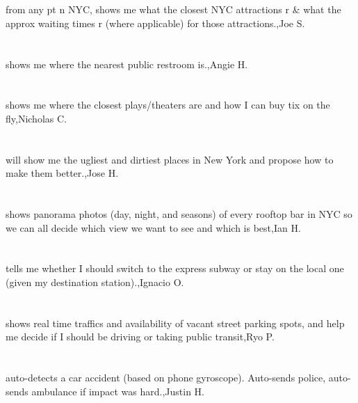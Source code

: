 \section{}from any pt n NYC, shows me what the closest NYC attractions r \& what the approx waiting times r (where applicable) for those attractions.,Joe S.
\section{}shows me where the nearest public restroom is.,Angie H.
\section{}shows me where the closest plays/theaters are and how I can buy tix on the fly,Nicholas C.
\section{}will show me  the ugliest and dirtiest  places in New York and propose how to make them better.,Jose H.
\section{}shows panorama photos (day, night, and seasons) of every rooftop bar in NYC so we can all decide which view we want to see and which is best,Ian H.
\section{}tells me whether I should switch to the express subway or stay on the local one (given my destination station).,Ignacio O.
\section{}shows real time traffics and availability of vacant street parking spots, and help me decide if I should be driving or taking public transit,Ryo P.
\section{} auto-detects a car accident (based on phone gyroscope). Auto-sends police, auto-sends ambulance if impact was hard.,Justin H.
